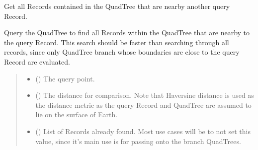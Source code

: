 \documentclass[letterpaper,10pt,english]{sphinxmanual}
\begin{document}
\begin{fulllineitems}
\begin{fulllineitems}
\begin{quote}
\begin{description}
\end{description}\end{quote}

\end{fulllineitems}


\begin{fulllineitems}
\label{\detokenize{quadtree:geotrees.quadtree.QuadTree.nearby_points}}
\pysigstartsignatures
\pysiglinewithargsret
{}
{\sphinxparamcomma {}\sphinxparamcomma {}\sphinxparamcomma {}}
{}
\pysigstopsignatures
\sphinxAtStartPar
Get all Records contained in the QuadTree that are nearby
another query Record.

\sphinxAtStartPar
Query the QuadTree to find all Records within the QuadTree that
are nearby to the query Record. This search should be faster
than searching through all records, since only QuadTree branch whose
boundaries are close to the query Record are evaluated.
\begin{quote}\begin{description}
\begin{itemize}
\item {}
\sphinxAtStartPar
{} ({\hyperref[\detokenize{record:geotrees.record.Record}]{}}) \textendash{} The query point.

\item {}
\sphinxAtStartPar
{} () \textendash{} The distance for comparison. Note that Haversine distance is used
as the distance metric as the query Record and QuadTree are
assumed to lie on the surface of Earth.

\item {}
\sphinxAtStartPar
{} (\sphinxstyleliteralemphasis{\sphinxupquote{ | }}) \textendash{} List of Records already found. Most use cases will be to
not set this value, since it’s main use is for passing onto the
branch QuadTrees.


\end{itemize}
\end{description}
\end{quote}
\end{fulllineitems}
\end{fulllineitems}
\end{document}
